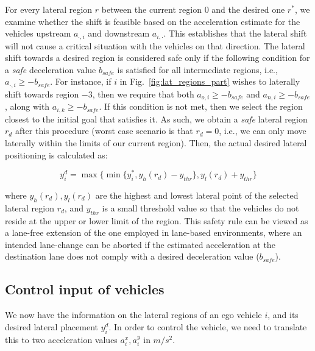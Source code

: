 For every lateral region $r$ between the current region $0$ and the desired one $r^*$, we examine whether the shift is feasible based on the acceleration estimate for the vehicles upstream $a_{\cdot,i}$ and downstream $a_{i,\cdot}$.
This establishes that the lateral shift will not cause a critical situation with the vehicles on that direction.
The lateral shift towards a desired region is considered safe only if the following condition for a {\em safe} deceleration value $b_{safe}$ is satisfied for all intermediate regions, i.e., $a_{\cdot,i} \geq -b_{safe}$.
For instance, if $i$ in Fig.~\ref{fig:lat_regions_part} wishes to laterally shift towards region $-3$, then we require that both $a_{o,i}\geq -b_{safe}$ and $a_{n,i}\geq -b_{safe}$, along with $a_{i,k}\geq -b_{safe}$.
If this condition is not met, then we select the region closest to the initial goal that satisfies it.
As such, we obtain a {\em safe} lateral region $r_d$ after this procedure (worst case scenario is that $r_d=0$, i.e., we can only move laterally within the limits of our current region).
Then, the actual desired lateral positioning is calculated as:

\begin{equation}
    y_i^d = \max {\big \{ \min {\{ y_i^{*},y_h(r_d)-y_{thr}\}}, y_l(r_d) + y_{thr} \big \}}
\end{equation}

\noindent where $y_h(r_d),y_l(r_d)$ are the highest and lowest lateral point of the selected lateral region $r_d$, and $y_{thr}$ is a small threshold value so that the vehicles do not reside at the upper or lower limit of the region.
This safety rule can be viewed as a lane-free extension of the one employed in lane-based environments, where an intended lane-change can be aborted if the estimated acceleration at the destination lane does not comply with a desired deceleration value ($b_{safe}$).


\subsection{Control input of vehicles}

We now have the information on the lateral regions of an ego vehicle $i$, and its desired lateral placement $y_i^d$.
In order to control the vehicle, we need to translate this to two acceleration values $a^x_i,a^y_i$ in $m / s^2$.

